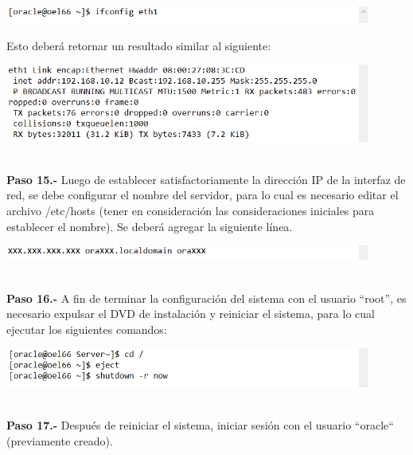 \begin{enumerate}
\begin{center}
  \includegraphics[width=12cm]{Imagenes/Oracle_Database/Paso_14.png}
\end{center}
Esto deberá retornar un resultado similar al siguiente:
\begin{center}
  \includegraphics[width=12cm]{Imagenes/Oracle_Database/Paso_14_2.png}
\end{center}
\vspace{12pt}\\

\textbf {Paso 15.-} Luego de establecer satisfactoriamente la dirección IP de la interfaz de red, se debe configurar el nombre del servidor, para lo cual es necesario editar el archivo /etc/hosts (tener en consideración las consideraciones iniciales para establecer el nombre). Se deberá agregar la siguiente línea.

\begin{center}
  \includegraphics[width=12cm]{Imagenes/Oracle_Database/Paso_15.png}
\end{center}
\vspace{12pt}\\

\textbf {Paso 16.-} A fin de terminar la configuración del sistema con el usuario “root”, es necesario expulsar el DVD de instalación y reiniciar el sistema, para lo cual ejecutar los siguientes comandos:

\begin{center}
  \includegraphics[width=12cm]{Imagenes/Oracle_Database/Paso_16.png}
\end{center}
\vspace{12pt}\\

\textbf {Paso 17.-} Después de reiniciar el sistema, iniciar sesión con el usuario “oracle“ (previamente creado).
\vspace{12pt}\\


\end{enumerate}
